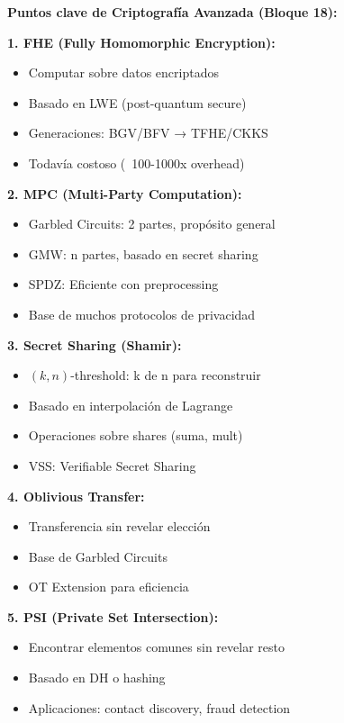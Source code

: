\documentclass[11pt,a4paper,twoside]{book}
\theoremstyle{definition}
\theoremstyle{remark}
\begin{document}
\begin{keyidea}
\textbf{Puntos clave de Criptografía Avanzada (Bloque 18):}

\textbf{1. FHE (Fully Homomorphic Encryption):}
\begin{itemize}
    \item Computar sobre datos encriptados
    \item Basado en LWE (post-quantum secure)
    \item Generaciones: BGV/BFV → TFHE/CKKS
    \item Todavía costoso (~100-1000x overhead)
\end{itemize}

\textbf{2. MPC (Multi-Party Computation):}
\begin{itemize}
    \item Garbled Circuits: 2 partes, propósito general
    \item GMW: n partes, basado en secret sharing
    \item SPDZ: Eficiente con preprocessing
    \item Base de muchos protocolos de privacidad
\end{itemize}

\textbf{3. Secret Sharing (Shamir):}
\begin{itemize}
    \item $(k,n)$-threshold: k de n para reconstruir
    \item Basado en interpolación de Lagrange
    \item Operaciones sobre shares (suma, mult)
    \item VSS: Verifiable Secret Sharing
\end{itemize}

\textbf{4. Oblivious Transfer:}
\begin{itemize}
    \item Transferencia sin revelar elección
    \item Base de Garbled Circuits
    \item OT Extension para eficiencia
\end{itemize}

\textbf{5. PSI (Private Set Intersection):}
\begin{itemize}
    \item Encontrar elementos comunes sin revelar resto
    \item Basado en DH o hashing
    \item Aplicaciones: contact discovery, fraud detection
\end{itemize}


\end{keyidea}
\end{document}
